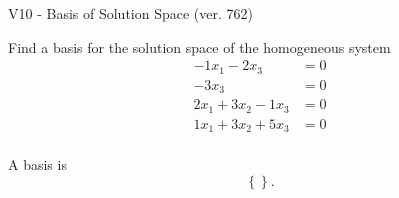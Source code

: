 \begin{exercise}
  \begin{exerciseTitle}V10 - Basis of Solution Space (ver. 762)\end{exerciseTitle}
  \begin{exerciseStatement}
    Find a basis for the solution space of the homogeneous system 
\begin{align*}
 -1 x_ 1 -2 x_ 3 &= 0  \\ 
  -3 x_ 3 &= 0  \\ 
  2 x_ 1 + 3 x_ 2 -1 x_ 3 &= 0  \\ 
  1 x_ 1 + 3 x_ 2 + 5 x_ 3 &= 0  \\ 
 \end{align*}


 
  \end{exerciseStatement}

  \begin{exerciseAnswer}
   A basis is   
\[\left\{\right\}.\]

  


  \end{exerciseAnswer}
\end{exercise}